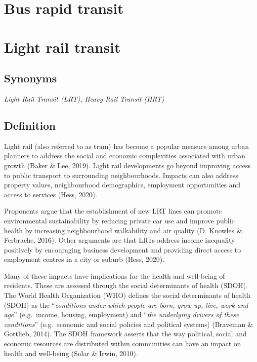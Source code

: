 \documentclass[
]{book}
\begin{document}
\hypertarget{brt}{%
\section{Bus rapid transit}\label{brt}}

\hypertarget{lrt}{%
\section{Light rail transit}\label{lrt}}

\hypertarget{synonyms-35}{%
\subsection*{Synonyms}\label{synonyms-35}}

\emph{Light Rail Transit (LRT), Heavy Rail Transit (HRT)}

\hypertarget{definition-38}{%
\subsection*{Definition}\label{definition-38}}

Light rail (also referred to as tram) has become a popular measure among urban planners to address the social and economic complexities associated with urban growth (Baker \& Lee, 2019). Light rail developments go beyond improving access to public transport to surrounding neighbourhoods. Impacts can also address property values, neighbourhood demographics, employment opportunities and access to services (Hess, 2020).

Proponents argue that the establishment of new LRT lines can promote environmental sustainability by reducing private car use and improve public health by increasing neighbourhood walkability and air quality (D. Knowles \& Ferbrache, 2016). Other arguments are that LRTs address income inequality positively by encouraging business development and providing direct access to employment centres in a city or suburb (Hess, 2020).

Many of these impacts have implications for the health and well-being of residents. These are assessed through the social determinants of health (SDOH). The World Health Organization (WHO) defines the social determinants of health (SDOH) as the ``\emph{conditions under which people are born, grow up, live, work and age}'' (e.g.~income, housing, employment) and ``\emph{the underlying drivers of these conditions}'' (e.g.~economic and social policies and political systems) (Braveman \& Gottlieb, 2014). The SDOH framework asserts that the way political, social and economic resources are distributed within communities can have an impact on health and well-being (Solar \& Irwin, 2010).
\end{document}
